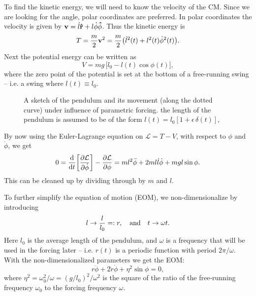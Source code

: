 \documentclass[11pt,letter, swedish, english
]{article}
\begin{document}
To find the kinetic energy, we will need to know the velocity of the
CM. Since we are looking for the angle, polar coordinates
are preferred. In polar coordinates the velocity is given by
$\vb{v}=\dot{l}\vu{r}+l\dot{\phi}\vu{\phi}$. Thus the kinetic energy is
\begin{equation}
T=\frac{m}{2}\vb{v}^2=\frac{m}{2}\qty(\dot{l}^2(t)+l^2(t)\dot{\phi}^2(t)).
\end{equation}
Next the potential energy can be written as
\begin{equation}
V=mg\,\Big[l_0-l(t)\cos\phi(t)\Big],
\end{equation}
where the zero point of the potential is set at the bottom of a
free-running swing -- i.e. a swing where $l(t)\equiv l_0$. 

\begin{figure}\centering
\resizebox{.2\textwidth}{!}{}
\caption{A sketch of the pendulum and its movement (along the dotted
  curve) under influence of parametric forcing. the length of the
  pendulum is assumed to be of the 
form $l(t)=l_0[1+\epsilon\,\delta(t)]$, 
}
\label{fig:pendulum}
\end{figure}

By now using the Euler-Lagrange equation on $\mathcal{L}=T-V$, with
 respect to $\phi$ and $\dot\phi$, we get
\begin{equation}
0=\dv{t}\qty[\pdv{\mathcal{L}}{\dot{\phi}}]-\pdv{\mathcal{L}}{\phi}
=ml^2\ddot\phi +2ml\dot{l}\dot\phi +mgl\sin\phi.
\end{equation}
This can be cleaned up by dividing through by $m$ and $l$. 

To further simplify the equation of motion (EOM), we
non-dimensionalize by introducing
\begin{equation}\label{eq:non-dim}
l\to \frac{l}{l_0}=:r\qcomma\text{and}\quad
t\to\omega t.
\end{equation}
Here $l_0$ is the average length of the pendulum, and $\omega$ is a
frequency that will be used in the forcing later -- i.e. $r(t)$ is a
periodic function with period $2\pi/\omega$. 
With the non-dimensionalized parameters we get the EOM:
\begin{equation}\label{eq:eom}
r\ddot\phi+2\dot{r}\dot\phi + \eta^2\sin\phi=0,
\end{equation}
where %
$\eta^2=\omega_0^2/\omega=(g/l_0)^2/\omega^2$ is the square of the
ratio of the free-running frequency $\omega_0$ to the forcing
frequency $\omega$. 
\end{document}
